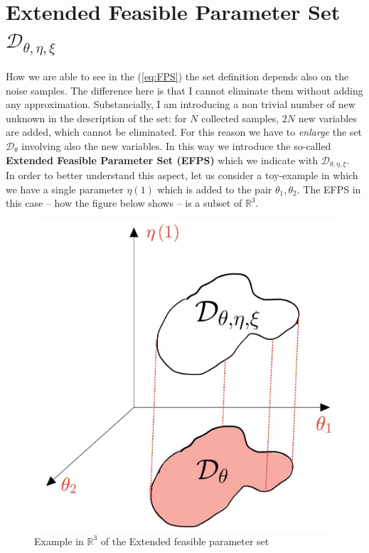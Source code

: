 \section{Extended Feasible Parameter Set $\mathcal{D}_{\theta,\eta,\xi}$}
How we are able to see in the (\ref{eq:FPS}) the set definition depends also on the noise samples. The difference here is that I cannot eliminate them without adding any approximation. Substancially, I am introducing a non trivial number of new unknown in the description of the set: for $N$ collected samples, $2N$ new variables are added, which cannot be eliminated. For this reason we have to \textit{enlarge} the set $\mathcal{D}_\theta$ involving also the new variables. In this way we introduce the so-called \textbf{Extended Feasible Parameter Set (EFPS)} which we indicate with $\mathcal{D}_{\theta,\eta,\xi}$. \\
In order to better understand this aspect, let us consider a toy-example in which we have a single parameter $\eta(1)$ which is added to the pair $\theta_1, \theta_2$. The EFPS in this case -- how the figure below shows -- is a subset of $\mathbb{R}^3$.
\vspace{-0.2cm}
\begin{figure}[h]
    \centering
    \includegraphics[scale=0.15]{img/EFPS.jpeg}
    \caption{Example in $\mathbb{R}^3$ of the Extended feasible parameter set}
\end{figure}


